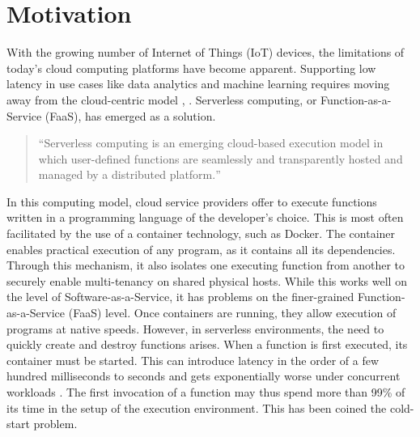 

\newcommand{\inl}[1]{\texttt|#1|}

\newcommand{\quot}[1]{\foreignquote{german}{#1}}

\section{Motivation}

With the growing number of Internet of Things (IoT) devices, the limitations of today's cloud computing platforms have become apparent. Supporting low latency in use cases like data analytics and machine learning requires moving away from the cloud-centric model \cite{Nastic2017}, \cite{Rausch2019}. Serverless computing, or Function-as-a-Service (FaaS), has emerged as a solution.

\begin{quote}
  \quot{Serverless computing is an emerging cloud-based execution model in which user-defined functions are seamlessly and transparently hosted and managed by a distributed platform.} \cite{Nastic2017}
\end{quote}

In this computing model, cloud service providers offer to execute functions written in a programming language of the developer's choice. This is most often facilitated by the use of a container technology, such as Docker. The container enables practical execution of any program, as it contains all its dependencies. Through this mechanism, it also isolates one executing function from another to securely enable multi-tenancy on shared physical hosts. While this works well on the level of Software-as-a-Service, it has problems on the finer-grained Function-as-a-Service (FaaS) level. Once containers are running, they allow execution of programs at native speeds. However, in serverless environments, the need to quickly create and destroy functions arises. When a function is first executed, its container must be started. This can introduce latency in the order of a few hundred milliseconds to seconds \cite{Manner2018} and gets exponentially worse under concurrent workloads \cite{Mohan2019}. The first invocation of a function may thus spend more than 99\% of its time in the setup of the execution environment. This has been coined the cold-start problem. 

